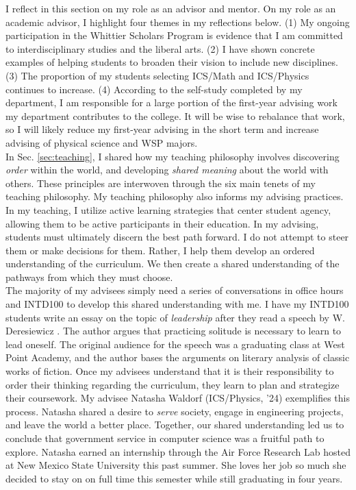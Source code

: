 \documentclass[../../main.tex]{subfiles}
\begin{document}
\label{sec:advising_mentoring}

I reflect in this section on my role as an advisor and mentor.  On my role as an academic advisor, I highlight four themes in my reflections below.  (1) My ongoing participation in the Whittier Scholars Program is evidence that I am committed to interdisciplinary studies and the liberal arts.  (2) I have shown concrete examples of helping students to broaden their vision to include new disciplines.  (3) The proportion of my students selecting ICS/Math and ICS/Physics continues to increase.  (4) According to the self-study completed by my department, I am responsible for a large portion of the first-year advising work my department contributes to the college.  It will be wise to rebalance that work, so I will likely reduce my first-year advising in the short term and increase advising of physical science and WSP majors.
\\
\vspace{0.15cm}
In Sec. \ref{sec:teaching}, I shared how my teaching philosophy involves discovering \textit{order} within the world, and developing \textit{shared meaning} about the world with others.  These principles are interwoven through the six main tenets of my teaching philosophy.  My teaching philosophy also informs my advising practices.  In my teaching, I utilize active learning strategies that center student agency, allowing them to be active participants in their education.  In my advising, students must ultimately discern the best path forward.  I do not attempt to steer them or make decisions for them.  Rather, I help them develop an ordered understanding of the curriculum.  We then create a shared understanding of the pathways from which they must choose.
\\
\vspace{0.15cm}
The majority of my advisees simply need a series of conversations in office hours and INTD100 to develop this shared understanding with me.  I have my INTD100 students write an essay on the topic of \textit{leadership} after they read a speech by W. Deresiewicz \cite{west_point}.  The author argues that practicing solitude is necessary to learn to lead oneself.  The original audience for the speech was a graduating class at West Point Academy, and the author bases the arguments on literary analysis of classic works of fiction.  Once my advisees understand that it is their responsibility to order their thinking regarding the curriculum, they learn to plan and strategize their coursework.  My advisee Natasha Waldorf (ICS/Physics, '24) exemplifies this process.  Natasha shared a desire to \textit{serve} society, engage in engineering projects, and leave the world a better place.  Together, our shared understanding led us to conclude that government service in computer science was a fruitful path to explore.  Natasha earned an internship through the Air Force Research Lab hosted at New Mexico State University this past summer.  She loves her job so much she decided to stay on on full time this semester while still graduating in four years.
\end{document}
